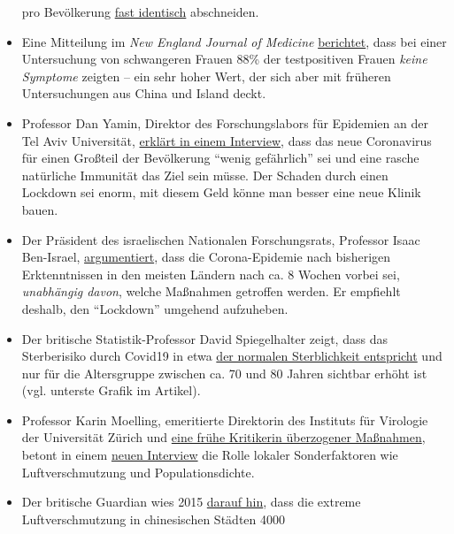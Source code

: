 \begin{itemize}
  pro Bevölkerung
  \href{http://www.theblogmire.com/a-comparison-of-lockdown-uk-with-non-lockdown-sweden/}{fast
  identisch} abschneiden.
\item
  Eine Mitteilung im \emph{New England Journal of Medicine}
  \href{https://www.nejm.org/doi/full/10.1056/NEJMc2009316}{berichtet},
  dass bei einer Untersuchung von schwangeren Frauen 88\% der
  testpositiven Frauen \emph{keine Symptome} zeigten -- ein sehr hoher
  Wert, der sich aber mit früheren Untersuchungen aus China und Island
  deckt.
\item
  Professor Dan Yamin, Direktor des Forschungslabors für Epidemien an
  der Tel Aviv Universität,
  \href{https://www.ynet.co.il/articles/0,7340,L-5714371,00.html}{erklärt
  in einem Interview}, dass das neue Coronavirus für einen Großteil der
  Bevölkerung ``wenig gefährlich'' sei und eine rasche natürliche
  Immunität das Ziel sein müsse. Der Schaden durch einen Lockdown sei
  enorm, mit diesem Geld könne man besser eine neue Klinik bauen.
\item
  Der Präsident des israelischen Nationalen Forschungsrats, Professor
  Isaac Ben-Israel,
  \href{https://www.timesofisrael.com/top-israeli-prof-claims-simple-stats-show-virus-plays-itself-out-after-70-days/}{argumentiert},
  dass die Corona-Epidemie nach bisherigen Erktenntnissen in den meisten
  Ländern nach ca. 8 Wochen vorbei sei, \emph{unabhängig davon}, welche
  Maßnahmen getroffen werden. Er empfiehlt deshalb, den ``Lockdown''
  umgehend aufzuheben.
\item
  Der britische Statistik-Professor David Spiegelhalter zeigt, dass das
  Sterberisiko durch Covid19 in etwa
  \href{https://medium.com/wintoncentre/how-much-normal-risk-does-covid-represent-4539118e1196}{der
  normalen Sterblichkeit entspricht} und nur für die Altersgruppe
  zwischen ca. 70 und 80 Jahren sichtbar erhöht ist (vgl. unterste
  Grafik im Artikel).
\item
  Professor Karin Moelling, emeritierte Direktorin des Instituts für
  Virologie der Universität Zürich und
  \href{https://www.rubikon.news/artikel/die-stimme-der-vernunft}{eine
  frühe Kritikerin überzogener Maßnahmen}, betont in einem
  \href{https://www.youtube.com/watch?v=4rl2sqLcDoQ}{neuen Interview}
  die Rolle lokaler Sonderfaktoren wie Luftverschmutzung und
  Populationsdichte.
\item
  Der britische Guardian wies 2015
  \href{https://www.theguardian.com/world/2015/aug/14/air-pollution-in-china-is-killing-4000-people-every-day-a-new-study-finds}{darauf
  hin}, dass die extreme Luftverschmutzung in chinesischen Städten 4000

\end{itemize}
